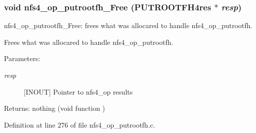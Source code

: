 \subsubsection{\setlength{\rightskip}{0pt plus 5cm}void nfs4\_\-op\_\-putrootfh\_\-Free (PUTROOTFH4res $\ast$ {\em resp})}\label{nfs4__op__putrootfh_8c_a4}


nfs4\_\-op\_\-putrootfh\_\-Free: frees what was allocared to handle nfs4\_\-op\_\-putrootfh.

Frees what was allocared to handle nfs4\_\-op\_\-putrootfh.

\begin{Desc}
\item[Parameters:]
\begin{description}
\item[{\em resp}][INOUT] Pointer to nfs4\_\-op results\end{description}
\end{Desc}
\begin{Desc}
\item[Returns:]nothing (void function ) \end{Desc}


Definition at line 276 of file nfs4\_\-op\_\-putrootfh.c.